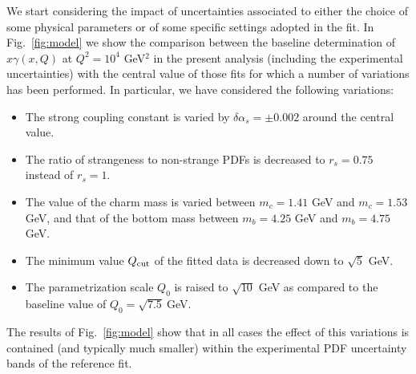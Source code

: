 We start considering the impact of uncertainties associated to either
the choice of some physical parameters or of some specific settings
adopted in the fit.
%
In Fig.~\ref{fig:model} we show the comparison between the baseline
determination of $x\gamma(x,Q)$ at $Q^2=10^4$ GeV$^2$ in the present
analysis (including the experimental uncertainties) with the central
value of those fits for which a number of variations has been
performed.
%
In particular, we have considered the following variations:
\begin{itemize}
\item The strong coupling constant is varied by $\delta \alpha_s=\pm 0.002$ around the central value.
\item The ratio of strangeness to non-strange PDFs is decreased to $r_s=0.75$ instead of $r_s=1$.
\item The value of the charm mass is varied between $m_c=1.41$ GeV and $m_c=1.53$ GeV,
  and that of the bottom mass between $m_b=4.25$ GeV and $m_b=4.75$ GeV.
\item The minimum value $Q_{\rm cut}$ of the fitted data is decreased down to $\sqrt{5}$ GeV.
\item The parametrization scale $Q_0$ is raised to $\sqrt{10}$ GeV as compared
  to the baseline value of $Q_0=\sqrt{7.5}~$GeV.
\end{itemize}
The results of Fig.~\ref{fig:model} show that in all cases the effect
of this variations is contained (and typically much smaller) within
the experimental PDF uncertainty bands of the reference fit.

